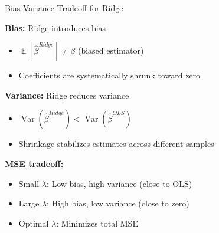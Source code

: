 \documentclass[10pt]{beamer}
\DeclareMathOperator{\E}{\mathbb{E}}
\DeclareMathOperator{\Var}{Var}
\begin{document}

\begin{frame}{Bias-Variance Tradeoff for Ridge}

\textbf{Bias:} Ridge introduces bias
\begin{itemize}
  \item $\E[\widehat{\beta}^{Ridge}] \neq \beta$ (biased estimator)
  \item Coefficients are systematically shrunk toward zero
\end{itemize}

\vspace{1em}
\textbf{Variance:} Ridge reduces variance
\begin{itemize}
  \item $\Var(\widehat{\beta}^{Ridge}) < \Var(\widehat{\beta}^{OLS})$
  \item Shrinkage stabilizes estimates across different samples
\end{itemize}

\vspace{1em}
\textbf{MSE tradeoff:}
\begin{itemize}
  \item Small $\lambda$: Low bias, high variance (close to OLS)
  \item Large $\lambda$: High bias, low variance (close to zero)
  \item Optimal $\lambda$: Minimizes total MSE
\end{itemize}

\end{frame}

\end{document}
